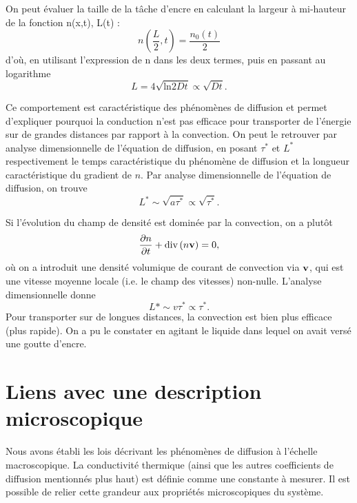 \documentclass[11pt,a4paper]{report}
\begin{document}
On peut évaluer la taille de la tâche d'encre en calculant la largeur à mi-hauteur de la fonction n(x,t), L(t) :
\begin{equation}
	n\left(\frac{L}{2},t\right) = \frac{n_0(t)}{2}
\end{equation}
d'où, en utilisant l'expression de n dans les deux termes, puis en passant au logarithme
\begin{equation}
	L = 4\sqrt{\text{ln}2Dt} \propto \sqrt{Dt}.
\end{equation}

Ce comportement est caractéristique des phénomènes de diffusion et permet d'expliquer pourquoi la conduction n'est pas efficace pour transporter de l'énergie sur de grandes distances par rapport à la convection. On peut le retrouver par analyse dimensionnelle de l'équation de diffusion, en posant $\tau^*$ et $L^*$ respectivement le temps caractéristique du phénomène de diffusion et la longueur caractéristique du gradient de $n$. Par analyse dimensionnelle de l'équation de diffusion, on trouve
\begin{equation}
	L^* \sim \sqrt{a\tau^*} \propto \sqrt{\tau^*}.
\end{equation}

Si l'évolution du champ de densité est dominée par la convection, on a plutôt
\begin{equation}
	\frac{\partial n}{\partial t} + \text{div}\left(n \bold{v}\right) = 0,
\end{equation}
où on a introduit une densité volumique de courant de convection via $\bold{v}$, qui est une vitesse moyenne locale (i.e. le champ des vitesses) non-nulle. L'analyse dimensionnelle donne
\begin{equation}
	L* \sim v \tau^* \propto \tau^*.
\end{equation}
Pour transporter sur de longues distances, la convection est bien plus efficace (plus rapide). On a pu le constater en agitant le liquide dans lequel on avait versé une goutte d'encre.




\newpage
\section{Liens avec une description microscopique}

Nous avons établi les lois décrivant les phénomènes de diffusion à l'échelle macroscopique. La conductivité thermique (ainsi que les autres coefficients de diffusion mentionnés plus haut) est définie comme une constante à mesurer. Il est possible de relier cette grandeur aux propriétés microscopiques du système. 
\end{document}
